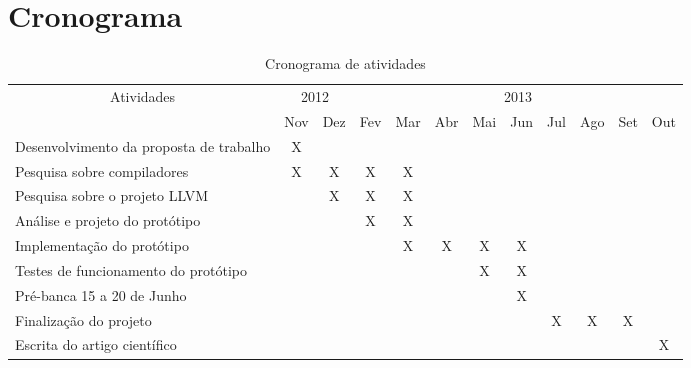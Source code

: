\chapter{Cronograma}
\label{pro:cronograma}

{\renewcommand{\arraystretch}{1.3}

\begin{table}[htbp]\footnotesize
  \begin{center}
    \begin{tabular}{|p{5cm}|c|c|c|c|c|c|c|c|c|c|c|} \hline
      \multicolumn{ 1}{|c|}{Atividades} & \multicolumn{ 2}{c|}{2012} & \multicolumn{ 9}{c|}{2013} \\ \cline{ 2- 12}
      \multicolumn{ 1}{|l|}{} & \multicolumn{1}{l|}{Nov} & \multicolumn{1}{l|}{Dez} & \multicolumn{1}{l|}{Fev} & \multicolumn{1}{l|}{Mar} & \multicolumn{1}{l|}{Abr} & \multicolumn{1}{l|}{Mai} & \multicolumn{1}{l|}{Jun} & \multicolumn{1}{l|}{Jul} & \multicolumn{1}{l|}{Ago} & \multicolumn{1}{l|}{Set} & \multicolumn{1}{l|}{Out} \\ \hline
      Desenvolvimento da proposta de trabalho & X &  &  &  &  &  &  &  &  &  &  \\ \hline
      Pesquisa sobre compiladores & X & X & X & X &  &  &  &  &  &  &  \\ \hline
      Pesquisa sobre o projeto LLVM &  & X & X & X &  &  &  &  &  &  &  \\ \hline
      Análise e projeto do protótipo &  &  & X & X &  &  &  &  &  &  &  \\ \hline
      Implementação do protótipo &  &  &  & X & X & X & X &  &  &  &  \\ \hline
      Testes de funcionamento do protótipo &  &  &  &  &  & X & X &  &  &  &  \\ \hline
      Pré-banca 15 a 20 de Junho &  &  &  &  &  &  & X &  &  &  &  \\ \hline
      Finalização do projeto &  &  &  &  &  &  &  & X & X & X &  \\ \hline
      Escrita do artigo científico &  &  &  &  &  &  &  &  &  &  & X \\ \hline
    \end{tabular}
  \end{center}
  \caption{Cronograma de atividades}
  \label{pro:tabela_cronograma}
\end{table}

} \quad
